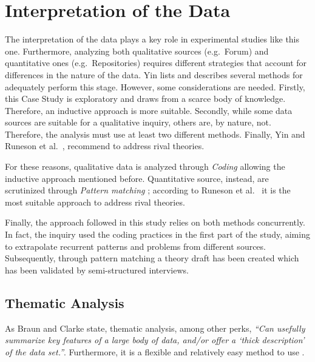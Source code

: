 %
%
%
%


%
%
%
%
\section{Interpretation of the Data} \label{data_interpretation}

The interpretation of the data plays a key role in experimental studies like this one. Furthermore, analyzing both qualitative sources (e.g.\ Forum) and quantitative ones (e.g.\ Repositories) requires different strategies that account for differences in the nature of the data. Yin \cite{case_study_guide} lists and describes several methods for adequately perform this stage. However, some considerations are needed. Firstly, this Case Study is exploratory and draws from a scarce body of knowledge. Therefore, an inductive approach is more suitable. Secondly, while some data sources are suitable for a qualitative inquiry, others are, by nature, not. Therefore, the analysis must use at least two different methods. Finally, Yin \cite{case_study_guide} and Runeson et al.\ \cite{case_study_software_engineering}, recommend to address rival theories.   

For these reasons, qualitative data is analyzed through \textit{Coding} \cite{qualitative_inquiry} allowing the inductive approach mentioned before. Quantitative source, instead, are scrutinized through \textit{Pattern matching} \cite{case_study_guide}; according to Runeson et al.\ \cite{case_study_software_engineering} it is the most suitable approach to address rival theories.

Finally, the approach followed in this study relies on both methods concurrently. In fact, the inquiry used the coding practices in the first part of the study, aiming to extrapolate recurrent patterns and problems from different sources. Subsequently, through pattern matching a theory draft has been created which has been validated by semi-structured interviews.

\subsection{Thematic Analysis}
As Braun and Clarke \cite{thematic_analysis} state, thematic analysis, among other perks, \textit{``Can usefully summarize key features of a large body of data, and/or offer a ‘thick description’ of the data set.''}. Furthermore, it is a flexible and relatively easy method to use \cite{thematic_analysis}.

